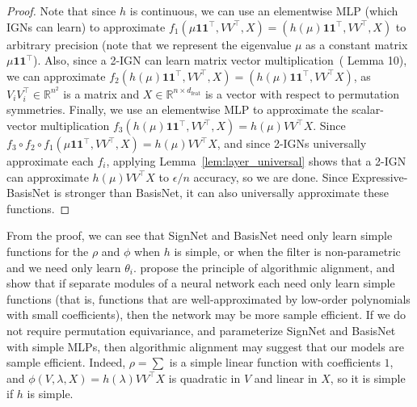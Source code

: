 \documentclass{article} \usepackage{iclr2023_conference,times}
\newcommand{\RR}{\mathbb R}
\newcommand{\mrm}[1]{\mathrm{#1}}
\newcommand{\dfeat}{d_{\mrm{feat}}}
\begin{document}
\begin{proof}
    Note that since $h$ is continuous, we can use an elementwise MLP (which IGNs can learn) to approximate $f_1(\mu\mathbf{11}^\top, VV^\top, X) = (h(\mu)\mathbf{11}^\top, VV^\top , X)$ to arbitrary precision (note that we represent the eigenvalue $\mu$ as a constant matrix $\mu \mathbf{11}^\top$). Also, since a 2-IGN can learn matrix vector multiplication~(\cite{cai2022convergence} Lemma 10), we can approximate $f_2(h(\mu)\mathbf{11}^\top, VV^\top, X) = (h(\mu)\mathbf{11}^\top, V V^\top X)$, as $V_i V_i^\top \in \RR^{n^2}$ is a matrix and $X \in \RR^{n \times \dfeat}$ is a vector with respect to permutation symmetries. Finally, we use an elementwise MLP to approximate the scalar-vector multiplication $f_3(h(\mu)\mathbf{11}^\top, VV^\top, X) = h(\mu) V V^\top X$. Since $f_3 \circ f_2 \circ f_1(\mu\mathbf{11}^\top, VV^\top, X) = h(\mu) VV^\top X$, and since 2-IGNs universally approximate each $f_i$, applying Lemma~\ref{lem:layer_universal} shows that a 2-IGN can approximate $h(\mu)VV^\top X$ to $\epsilon/n$ accuracy, so we are done. Since Expressive-BasisNet is stronger than BasisNet, it can also universally approximate these functions.
\end{proof}


From the proof, we can see that SignNet and BasisNet need only learn simple functions for the $\rho$ and $\phi$ when $h$ is simple, or when the filter is non-parametric and we need only learn $\theta_i$. \cite{xu2019can} propose the principle of algorithmic alignment, and show that if separate modules of a neural network each need only learn simple functions (that is, functions that are well-approximated by low-order polynomials with small coefficients), then the network may be more sample efficient. If we do not require permutation equivariance, and parameterize SignNet and BasisNet with simple MLPs, then algorithmic alignment may suggest that our models are sample efficient. Indeed, $\rho = \sum$ is a simple linear function with coefficients $1$, and $\phi(V, \lambda, X) = h(\lambda) V V^\top X$ is quadratic in $V$ and linear in $X$, so it is simple if $h$ is simple.
\end{document}

